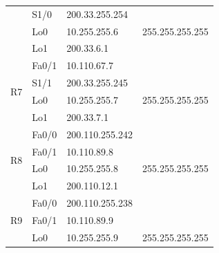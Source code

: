 \documentclass[12pt,twoside,a4paper]{report}
\begin{document}
\begin{table}[!htbp]
\begin{tabular}{|c|l|l|l|}
                     & S1/0                                    & 200.33.255.254                          &                                     \\ \cline{2-4} 
                     & Lo0                                     & 10.255.255.6                            & 255.255.255.255                     \\ \cline{2-4} 
                     & Lo1                                     & 200.33.6.1                              &                                     \\ \hline
\multirow{4}{*}{R7}  & Fa0/1                                   & 10.110.67.7                             &                                     \\ \cline{2-4} 
                     & S1/1                                    & 200.33.255.245                          &                                     \\ \cline{2-4} 
                     & Lo0                                     & 10.255.255.7                            & 255.255.255.255                     \\ \cline{2-4} 
                     & Lo1                                     & 200.33.7.1                              &                                     \\ \hline
\multirow{4}{*}{R8}  & Fa0/0                                   & 200.110.255.242                         &                                     \\ \cline{2-4} 
                     & Fa0/1                                   & 10.110.89.8                             &                                     \\ \cline{2-4} 
                     & Lo0                                     & 10.255.255.8                            & 255.255.255.255                     \\ \cline{2-4} 
                     & Lo1                                     & 200.110.12.1                            &                                     \\ \hline
\multirow{4}{*}{R9}  & Fa0/0                                   & 200.110.255.238                         &                                     \\ \cline{2-4} 
                     & Fa0/1                                   & 10.110.89.9                             &                                     \\ \cline{2-4} 
                     & Lo0                                     & 10.255.255.9                            & 255.255.255.255                     \\ \cline{2-4} 

\end{tabular}
\end{table}
\end{document}

